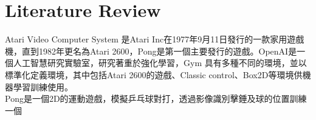 \chapter{Literature Review}
Atari Video Computer System 是Atari Inc在1977年9月11日發行的一款家用遊戲機，直到1982年更名為Atari 2600，Pong是第一個主要發行的遊戲。OpenAI是一個人工智慧研究實驗室，研究著重於強化學習，Gym 具有多種不同的環境，並以標準化定義環境，其中包括Atari 2600的遊戲、Classic control、Box2D等環境供機器學習訓練使用。\\

\qquad Pong是一個2D的運動遊戲，模擬乒乓球對打，透過影像識別擊錘及球的位置訓練一個